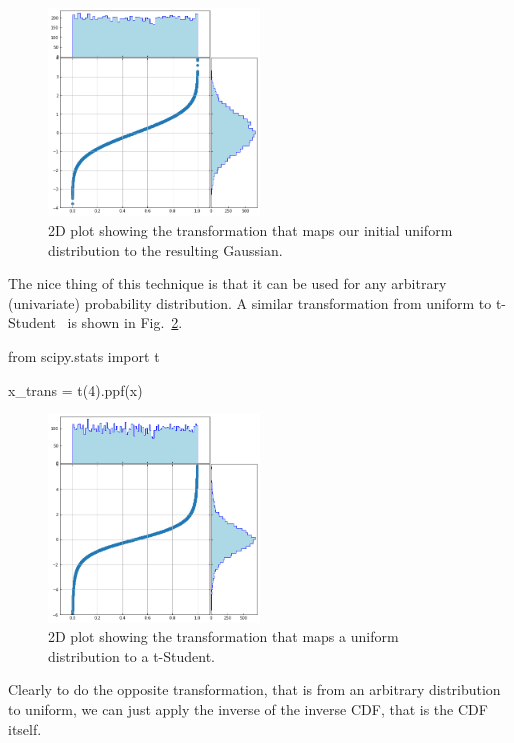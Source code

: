 \begin{figure}[htbp]
\centering
\includegraphics[width=0.5\textwidth]{figures/uniform_to_gauss}
\caption{2D plot showing the transformation that maps our initial uniform distribution to the resulting Gaussian.}
\label{fig:uniform_to_gauss}
\end{figure}
    
The nice thing of this technique is that it can be used for any arbitrary (univariate) probability distribution. A similar transformation from uniform to t-Student~\cite{bib:t_student} is shown in Fig.~\ref{fig:uniform_to_tstudent}.

\begin{ipython}
from scipy.stats import t

x_trans = t(4).ppf(x)
\end{ipython}

\begin{figure}[htbp]
\centering
\includegraphics[width=0.5\textwidth]{figures/tstudent_to_uniform}
\caption{2D plot showing the transformation that maps a uniform distribution to a t-Student.}
\label{fig:uniform_to_tstudent}
\end{figure}

Clearly to do the opposite transformation, that is from an arbitrary distribution to uniform, we can just apply the inverse of the inverse CDF, that is the CDF itself.

